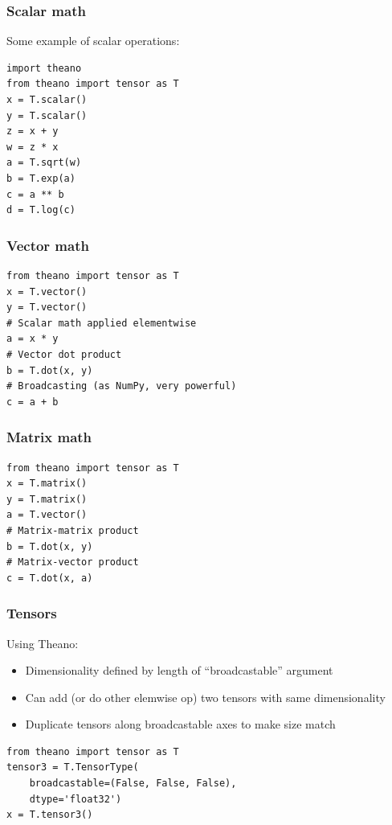 \documentclass[utf8x,xcolor=pdftex,dvipsnames,table]{beamer}
\begin{document}
\begin{frame}[fragile]
  \frametitle{Scalar math}
Some example of scalar operations:
\begin{lstlisting}
import theano
from theano import tensor as T
x = T.scalar()
y = T.scalar()
z = x + y
w = z * x
a = T.sqrt(w)
b = T.exp(a)
c = a ** b
d = T.log(c)
\end{lstlisting}
\end{frame}

\begin{frame}[fragile]
  \frametitle{Vector math}

\begin{lstlisting}
from theano import tensor as T
x = T.vector()
y = T.vector()
# Scalar math applied elementwise
a = x * y
# Vector dot product
b = T.dot(x, y)
# Broadcasting (as NumPy, very powerful)
c = a + b
\end{lstlisting}
\end{frame}

\begin{frame}[fragile]
  \frametitle{Matrix math}

\begin{lstlisting}
from theano import tensor as T
x = T.matrix()
y = T.matrix()
a = T.vector()
# Matrix-matrix product
b = T.dot(x, y)
# Matrix-vector product
c = T.dot(x, a)
\end{lstlisting}
\end{frame}

\begin{frame}[fragile]
  \frametitle{Tensors}
  Using Theano:
  \begin{itemize}
  \item Dimensionality defined by length of ``broadcastable'' argument
  \item Can add (or do other elemwise op) two
    tensors with same dimensionality
  \item Duplicate tensors along broadcastable axes to make size match
  \end{itemize}
\begin{lstlisting}
from theano import tensor as T
tensor3 = T.TensorType(
    broadcastable=(False, False, False),
    dtype='float32')
x = T.tensor3()
\end{lstlisting}
\end{frame}
\end{document}
